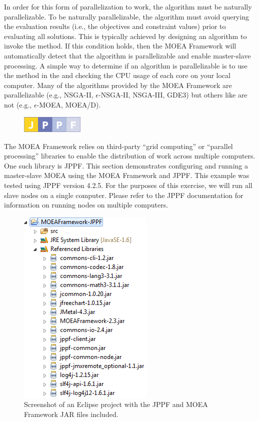 In order for this form of parallelization to work, the algorithm must be naturally parallelizable.  To be naturally parallelizable, the algorithm must avoid querying the evaluation results (i.e., the objectives and constraint values) prior to evaluating all solutions.  This is typically achieved by designing an algorithm to invoke the  method.  If this condition holds, then the MOEA Framework will automatically detect that the algorithm is parallelizable and enable master-slave processing.  A simple way to determine if an algorithm is parallelizable is to use the  method in the  and checking the CPU usage of each core on your local computer.  Many of the algorithms provided by the MOEA Framework are parallelizable (e.g., NSGA-II, $\epsilon$-NSGA-II, NSGA-III, GDE3) but others like are not (e.g., $\epsilon$-MOEA, MOEA/D).

\begin{figure}
  \includegraphics[width=3cm]{jppf.png}
\end{figure}
The MOEA Framework relies on third-party ``grid computing'' or ``parallel processing'' libraries to enable the distribution of work across multiple computers.  One such library is JPPF.  This section demonstrates configuring and running a master-slave MOEA using the MOEA Framework and JPPF.  This example was tested using JPPF version 4.2.5.  For the purposes of this exercise, we will run all slave nodes on a single computer.  Please refer to the JPPF documentation for information on running nodes on multiple computers.

\begin{figure}
  \center
  \includegraphics{jppfProjectSetup.png}
  \caption{Screenshot of an Eclipse project with the JPPF and MOEA Framework JAR files included.}
  \label{fig:jppfProjectSetup}
\end{figure}

